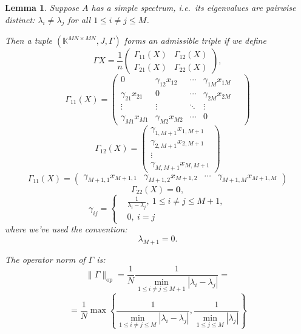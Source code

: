 \documentclass[14pt,a4paper]{extarticle}
\newtheorem{lem}{Lemma}
\theoremstyle{definition}
\begin{document}
\begin{lem}
Suppose \( A \) has a simple spectrum,
    i.e.\ its eigenvalues are pairwise distinct:
    \( \lambda_i\neq\lambda_j \) for all \( 1\leq i{\neq}j \leq M \).

    Then a tuple \( (\mathbb{K}^{{MN}{\times}{MN}}, J, \Gamma) \)
        forms an admissible triple if we define
    \[
        \Gamma X = 
        \frac1n \left(\begin{array}{c|c}
                        \Gamma_{11}(X) & \Gamma_{12}(X) \\ \hline
                        \Gamma_{21}(X) & \Gamma_{22}(X)
                      \end{array}\right),
                                      \]
    \[
        \Gamma_{11}(X) =
              \begin{pmatrix}
                0               & \gamma_{12}x_{12} & \cdots & \gamma_{1M}x_{1M} \\
                \gamma_{21}x_{21}  & 0              & \cdots & \gamma_{2M}x_{2M} \\
                \vdots          & \vdots         & \ddots & \vdots & \ \\
                \gamma_{M1}x_{M1}  & \gamma_{M2}x_{M2} & \cdots & 0
              \end{pmatrix}
    \]
    \[
        \Gamma_{12}(X) =
            \begin{pmatrix}
                \gamma_{1,M+1}x_{1,M+1} \\
                \gamma_{2,M+1}x_{2,M+1} \\
                \vdots \\
                \gamma_{M,M+1}x_{M,M+1}
            \end{pmatrix}
    \]
    \[
        \Gamma_{11}(X) =
            \begin{pmatrix}
                \gamma_{M{+}1,1}x_{M{+}1,1} &
                \gamma_{M{+}1,2}x_{M{+}1,2} &
                \cdots &
                \gamma_{M{+}1,M}x_{M{+}1,M}
            \end{pmatrix}
    \]
    \[
        \Gamma_{22}(X) = \mathbf{0},
    \]
    \[
        \gamma_{ij} = \left\{
            \begin{aligned}
                & \frac{1}{\lambda_i - \lambda_j},\ 1\leq i{\neq}j \leq M{+}1,\\
                & 0,\ i=j
            \end{aligned}
            \right.
    \]
    where we've used the convention:
    \[
        \lambda_{M{+}1} = 0.
    \]

    The operator norm of \( \Gamma \) is:
    \[
        \|\Gamma\|_{\mathrm{op}} =
        \frac1N
        \frac{1}{\min\limits_{1\leq i{\neq}j \leq M{+}1}|\lambda_i - \lambda_j|} =
        \]
    \[
        = \frac1N
         \max\left\{
         \frac{1}{
             \min\limits_{1\leq i{\neq}j \leq M }{|\lambda_i - \lambda_j|}},
         \frac{1}{
             \min\limits_{1\leq j \leq M}{|\lambda_j|}}
         \right\}
        \]
\end{lem}
\end{document}
